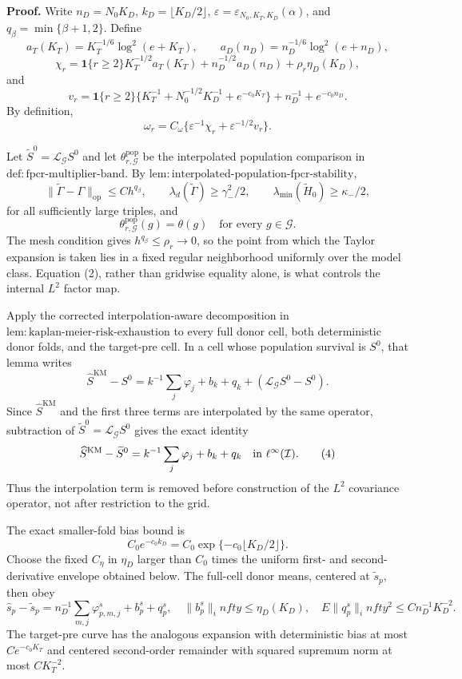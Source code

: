 \textbf{Proof.}
Write \(n_D=N_0K_D\), \(k_D=\lfloor K_D/2\rfloor\), \(\varepsilon=\varepsilon_{N_0,K_T,K_D}(\alpha)\), and \(q_\beta=\min\{\beta+1,2\}\). Define
\[
 a_T(K_T)=K_T^{-1/6}\log^2(e+K_T),
 \qquad
 a_D(n_D)=n_D^{-1/6}\log^2(e+n_D),
\]
\[
 \chi_r=\mathbf 1\{r\ge2\}K_T^{-1/2}a_T(K_T)
       +n_D^{-1/2}a_D(n_D)+\rho_r\eta_D(K_D),
\]
and
\[
 v_r=\mathbf 1\{r\ge2\}
 \{K_T^{-1}+N_0^{-1/2}K_D^{-1}+e^{-c_0K_T}\}
 +n_D^{-1}+e^{-c_0n_D}.
\]
By definition,
\[
 \omega_r=C_\omega\{\varepsilon^{-1}\chi_r+\varepsilon^{-1/2}v_r\}. \tag{1}
\]

Let \(\widetilde S^0=\mathcal L_{\mathcal G}S^0\) and let \(\theta^{\mathrm{pop}}_{r,\mathcal G}\) be the interpolated population comparison in \(\mathrm{def:fpcr\mbox{-}multiplier\mbox{-}band}\). By \(\mathrm{lem:interpolated\mbox{-}population\mbox{-}fpcr\mbox{-}stability}\),
\[
 \|\widetilde\Gamma-\Gamma\|_{\mathrm{op}}
 \le C h^{q_\beta},
 \qquad
 \lambda_d(\widetilde\Gamma)\ge\gamma_-^2/2,
 \qquad
 \lambda_{\min}(\widetilde H_0)\ge\kappa_-/2, \tag{2}
\]
for all sufficiently large triples, and
\[
 \theta^{\mathrm{pop}}_{r,\mathcal G}(g)=\theta(g)
 \quad\text{for every }g\in\mathcal G. \tag{3}
\]
The mesh condition gives \(h^{q_\beta}\le\rho_r\to0\), so the point from which the Taylor expansion is taken lies in a fixed regular neighborhood uniformly over the model class. Equation (2), rather than gridwise equality alone, is what controls the internal \(L^2\) factor map.

Apply the corrected interpolation-aware decomposition in \(\mathrm{lem:kaplan\mbox{-}meier\mbox{-}risk\mbox{-}exhaustion}\) to every full donor cell, both deterministic donor folds, and the target-pre cell. In a cell whose population survival is \(S^0\), that lemma writes
\[
 \widehat S^{\mathrm{KM}}-S^0
 =k^{-1}\sum_j\varphi_j+b_k+q_k+
   (\mathcal L_{\mathcal G}S^0-S^0).
\]
Since \(\widehat S^{\mathrm{KM}}\) and the first three terms are interpolated by the same operator, subtraction of \(\widetilde S^0=\mathcal L_{\mathcal G}S^0\) gives the exact identity
\[
 \widehat S^{\mathrm{KM}}-\widetilde S^0
 =k^{-1}\sum_j\varphi_j+b_k+q_k
 \quad\hbox{in }\ell^\infty(\mathcal I). \tag{4}
\]
Thus the interpolation term is removed before construction of the \(L^2\) covariance operator, not after restriction to the grid.

The exact smaller-fold bias bound is
\[
 C_0e^{-c_0k_D}=C_0\exp\{-c_0\lfloor K_D/2\rfloor\}. \tag{5}
\]
Choose the fixed \(C_\eta\) in \(\eta_D\) larger than \(C_0\) times the uniform first- and second-derivative envelope obtained below. The full-cell donor means, centered at \(\widetilde s_p\), then obey
\[
 \widehat s_p-\widetilde s_p
 =n_D^{-1}\sum_{m,j}\varphi^s_{p,m,j}+b^s_p+q^s_p,
 \quad
 \|b^s_p\|_infty\le\eta_D(K_D),
 \quad
 E\|q^s_p\|_infty^2\le Cn_D^{-1}K_D^{-2}. \tag{6}
\]
The target-pre curve has the analogous expansion with deterministic bias at most \(Ce^{-c_0K_T}\) and centered second-order remainder with squared supremum norm at most \(CK_T^{-2}\).

